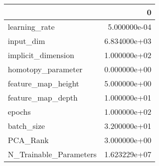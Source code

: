\begin{tabular}{lr}
\toprule
{} &             0 \\
\midrule
learning\_rate          &  5.000000e-04 \\
input\_dim              &  6.834000e+03 \\
implicit\_dimension     &  1.000000e+02 \\
homotopy\_parameter     &  0.000000e+00 \\
feature\_map\_height     &  5.000000e+00 \\
feature\_map\_depth      &  1.000000e+01 \\
epochs                 &  1.000000e+02 \\
batch\_size             &  3.200000e+01 \\
PCA\_Rank               &  3.000000e+00 \\
N\_Trainable\_Parameters &  1.623229e+07 \\
\bottomrule
\end{tabular}
